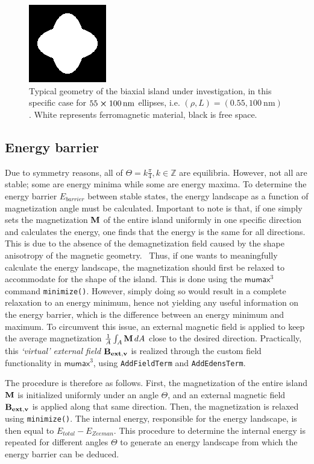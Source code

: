 \documentclass[11pt,a4paper,english]{article}
\newcommand{\code}[1]{\texttt{#1}}
\newcommand{\mumax}{$\mathsf{mumax}^3$}
\begin{document}
\begin{figure}
    \centering
    \includegraphics[width=0.3\columnwidth]{Figures/biaxial_island/Geometry/geomPlus55.png}
    \caption{Typical geometry of the biaxial island under investigation, in this specific case for $55\cross\SI{100}{\nano\metre}$ ellipses, i.e. $(\rho, L)=(0.55, \SI{100}{\nano\metre})$. White represents ferromagnetic material, black is free space.}
    \label{fig:biaxial_island:geometryTypical}
\end{figure}

\subsection{Energy barrier}
\label{par:Biaxial_EnergyBarrier}
Due to symmetry reasons, all of $\Theta = k\frac{\pi}{4} , k\in\mathbb{Z}$ are equilibria. However, not all are stable; some are energy minima while some are energy maxima. To determine the energy barrier $E_{barrier}$ between stable states, the energy landscape as a function of magnetization angle must be calculated. Important to note is that, if one simply sets the magnetization $\vb{M}$ of the entire island uniformly in one specific direction and calculates the energy, one finds that the energy is the same for all directions. This is due to the absence of the demagnetization field caused by the shape anisotropy of the magnetic geometry.~\cite{Nonmonotonic_reversal} Thus, if one wants to meaningfully calculate the energy landscape, the magnetization should first be relaxed to accommodate for the shape of the island. This is done using the \mumax{} command \code{minimize()}. However, simply doing so would result in a complete relaxation to an energy minimum, hence not yielding any useful information on the energy barrier, which is the difference between an energy minimum and maximum. To circumvent this issue, an external magnetic field is applied to keep the average magnetization $\frac{1}{A}\int_A \vb{M}\,dA$ close to the desired direction. Practically, this \textit{`virtual' external field} $\vb{B_{ext,v}}$ is realized through the custom field functionality in \mumax{}, using \code{AddFieldTerm} and \code{AddEdensTerm}. \par
The procedure is therefore as follows. First, the magnetization of the entire island $\vb{M}$ is initialized uniformly under an angle $\Theta$, and an external magnetic field $\vb{B_{ext,v}}$ is applied along that same direction. Then, the magnetization is relaxed using \code{minimize()}. The internal energy, responsible for the energy landscape, is then equal to $E_{total} - E_{Zeeman}$. This procedure to determine the internal energy is repeated for different angles $\Theta$ to generate an energy landscape from which the energy barrier can be deduced.
\end{document}
